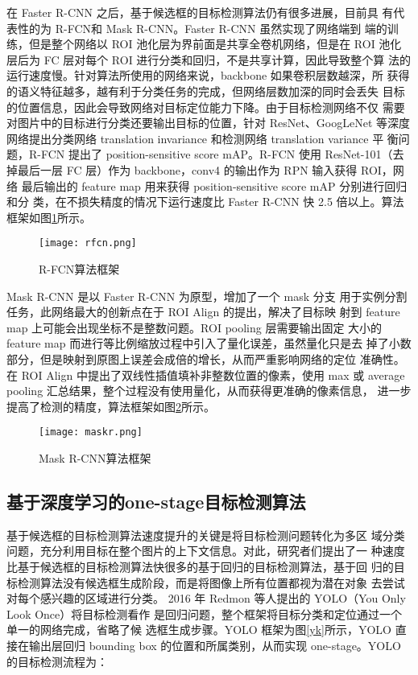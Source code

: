 在 Faster R-CNN 之后，基于候选框的目标检测算法仍有很多进展，目前具
有代表性的为 R-FCN\cite{dai2016r}和 Mask R-CNN\cite{he2017mask}。Faster R-CNN 虽然实现了网络端到
端的训练，但是整个网络以 ROI 池化层为界前面是共享全卷机网络，但是在 ROI
池化层后为 FC 层对每个 ROI 进行分类和回归，不是共享计算，因此导致整个算
法的运行速度慢。针对算法所使用的网络来说，backbone 如果卷积层数越深，所
获得的语义特征越多，越有利于分类任务的完成，但网络层数加深的同时会丢失
目标的位置信息，因此会导致网络对目标定位能力下降。由于目标检测网络不仅
需要对图片中的目标进行分类还要输出目标的位置，针对 ResNet、GoogLeNet
等深度网络提出分类网络 translation invariance 和检测网络 translation variance 平
衡问题，R-FCN 提出了 position-sensitive score mAP。R-FCN 使用 ResNet-101（去
掉最后一层 FC 层）作为 backbone，conv4 的输出作为 RPN 输入获得 ROI，网络
最后输出的 feature map 用来获得 position-sensitive score mAP 分别进行回归和分
类，在不损失精度的情况下运行速度比 Faster R-CNN 快 2.5 倍以上。算法框架如图\ref{rfcn}所示。

\begin{figure}[htbp]
    \centering
    \texttt{[image: rfcn.png]}
    \caption{R-FCN算法框架}
    \label{rfcn}
\end{figure}

Mask R-CNN 是以 Faster R-CNN 为原型，增加了一个 mask 分支
用于实例分割任务，此网络最大的创新点在于 ROI Align 的提出，解决了目标映
射到 feature map 上可能会出现坐标不是整数问题。ROI pooling 层需要输出固定
大小的 feature map 而进行等比例缩放过程中引入了量化误差，虽然量化只是去
掉了小数部分，但是映射到原图上误差会成倍的增长，从而严重影响网络的定位
准确性。在 ROI Align 中提出了双线性插值填补非整数位置的像素，使用 max 或
average pooling 汇总结果，整个过程没有使用量化，从而获得更准确的像素信息，
进一步提高了检测的精度，算法框架如图\ref{maskr}所示。

\begin{figure}[htbp]
    \centering
    \texttt{[image: maskr.png]}
    \caption{Mask R-CNN算法框架}
    \label{maskr}
\end{figure}

\subsection{基于深度学习的one-stage目标检测算法}
基于候选框的目标检测算法速度提升的关键是将目标检测问题转化为多区
域分类问题，充分利用目标在整个图片的上下文信息。对此，研究者们提出了一
种速度比基于候选框的目标检测算法快很多的基于回归的目标检测算法，基于回
归的目标检测算法没有候选框生成阶段，而是将图像上所有位置都视为潜在对象
去尝试对每个感兴趣的区域进行分类\cite{jiao2019survey,wu2020recent}。
2016 年 Redmon 等人提出的 YOLO（You Only Look Once）将目标检测看作
是回归问题\cite{redmon2016you}，整个框架将目标分类和定位通过一个单一的网络完成，省略了候
选框生成步骤。YOLO 框架为图\ref{yk}所示，YOLO 直接在输出层回归 bounding box
的位置和所属类别，从而实现 one-stage。YOLO 的目标检测流程为：

